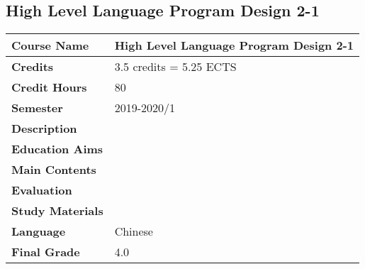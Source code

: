 \subsection{High Level Language Program Design 2-1}
\renewcommand{\arraystretch}{1.5} %
\begin{longtable}{|p{}|p{}|}

\hline%

\textbf{Course Name} & High Level Language Program Design 2-1
\\ \hline
\textbf{Credits} & 3.5 credits = 5.25 ECTS
\\ \hline
\textbf{Credit Hours} & 80
\\ \hline
\textbf{Semester} & 2019-2020/1 
\\ \hline
\textbf{Description} &  
\\ \hline
\textbf{Education Aims} &  
\\ \hline
\textbf{Main Contents} &  
\\ \hline
\textbf{Evaluation} &  
\\ \hline
\textbf{Study Materials} &  
\\ \hline
\textbf{Language} & Chinese 
\\ \hline
\textbf{Final Grade} & 4.0
\\ \hline


\end{longtable}
